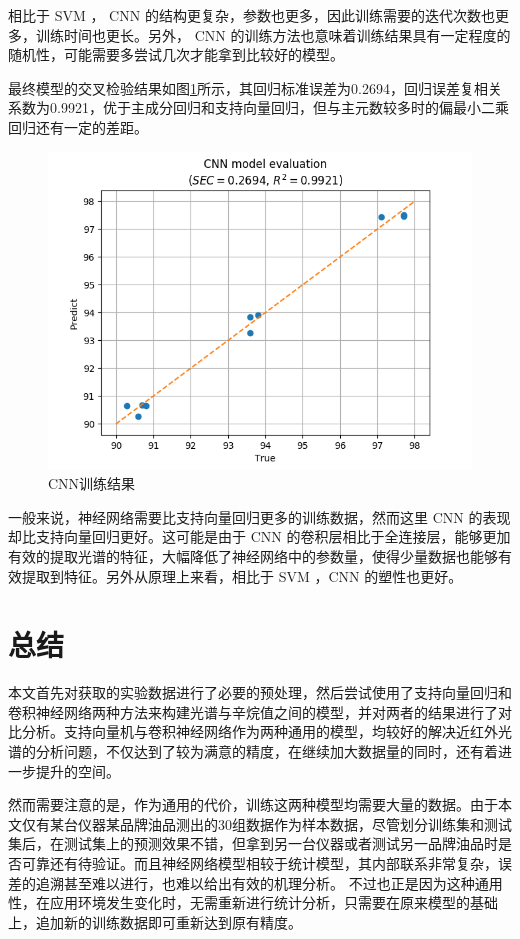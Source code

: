 \documentclass[a4paper]{article}
\begin{document}
			相比于 SVM ， CNN 的结构更复杂，参数也更多，因此训练需要的迭代次数也更多，训练时间也更长。另外， CNN 的训练方法也意味着训练结果具有一定程度的随机性，可能需要多尝试几次才能拿到比较好的模型。
			
			最终模型的交叉检验结果如图\ref{fig:cnnresult}所示，其回归标准误差为0.2694，回归误差复相关系数为0.9921，优于主成分回归和支持向量回归，但与主元数较多时的偏最小二乘回归还有一定的差距。
			
			\begin{figure}
				\centering
				\includegraphics[width=\linewidth]{../img/cnn_result}
				\caption{CNN训练结果}
				\label{fig:cnnresult}
			\end{figure}
			
			一般来说，神经网络需要比支持向量回归更多的训练数据，然而这里 CNN 的表现却比支持向量回归更好。这可能是由于 CNN 的卷积层相比于全连接层，能够更加有效的提取光谱的特征，大幅降低了神经网络中的参数量，使得少量数据也能够有效提取到特征。另外从原理上来看，相比于 SVM ，CNN 的塑性也更好。
			
	\section{总结}
		本文首先对获取的实验数据进行了必要的预处理，然后尝试使用了支持向量回归和卷积神经网络两种方法来构建光谱与辛烷值之间的模型，并对两者的结果进行了对比分析。支持向量机与卷积神经网络作为两种通用的模型，均较好的解决近红外光谱的分析问题，不仅达到了较为满意的精度，在继续加大数据量的同时，还有着进一步提升的空间。
		
		然而需要注意的是，作为通用的代价，训练这两种模型均需要大量的数据。由于本文仅有某台仪器某品牌油品测出的30组数据作为样本数据，尽管划分训练集和测试集后，在测试集上的预测效果不错，但拿到另一台仪器或者测试另一品牌油品时是否可靠还有待验证。而且神经网络模型相较于统计模型，其内部联系非常复杂，误差的追溯甚至难以进行，也难以给出有效的机理分析。
		不过也正是因为这种通用性，在应用环境发生变化时，无需重新进行统计分析，只需要在原来模型的基础上，追加新的训练数据即可重新达到原有精度。
		
\end{document}
